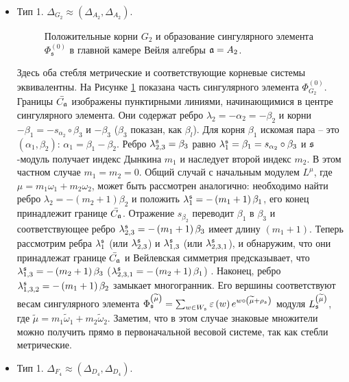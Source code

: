 \begin{itemize}
\item
Тип 1. $\Delta _{G_{2}}\approx (\Delta _{A_{2}},\Delta
_{A_{2}}).$

 \begin{figure}[h!bt]
  \noindent{}
  \caption{Положительные корни $G_{2}$ и образование сингулярного элемента $\Phi^{(0)}_{\mathfrak{s}}$ в главной камере Вейля алгебры $\mathfrak{a}=A_{2}$.}
  \label{fig:g2-roots}
\end{figure}
Здесь оба стебля метрические и соответствующие корневые системы эквивалентны. На Рисунке \ref{fig:g2-roots} показана часть сингулярного элемента $\Phi_{G_{2}}^{\left( 0\right) }$. Границы  $\bar{C_{\frak{a}}}$ изображены пунктирными линиями, начинающимися в центре сингулярного элемента. Они содержат ребро $\lambda _{2}=-\alpha _{2}=-\beta _{2}$ и корни $-\beta _{1}=-s_{\alpha _{2}}\circ \beta _{3}$ и $ -\beta _{3}$
($\beta _{3}$ показан, как $\beta _{l}$). Для корня $\beta_{1}$ искомая пара -- это  $(\alpha _{1}, \beta _{2})$: $\alpha _{1}=\beta _{1}-\beta _{2}$. Ребро $\lambda _{2,3}^{\mathfrak{s}}=\beta _{3}$ равно  $\lambda _{1}^{\frak{s}}=\beta _{1}=s_{\alpha _{2}}\circ \beta _{3}$ и  $\mathfrak{s}$-модуль получает индекс Дынкина $m_{1}$  и наследует второй индекс $m_{2}$. В этом частном случае  $m_{1}=m_{2}=0$.  Общий случай с начальным модулем $L^{\mu }$, где $\mu =m_{1}\omega _{1}+m_{2}\omega _{2}$, может быть рассмотрен аналогично: необходимо найти ребро $\lambda _{2}=-\left(
m_{2}+1\right) \beta _{2}$ и положить $\lambda_{1}^{\mathfrak{s}}=-\left( m_{1}+1\right) \beta _{1}$, его конец принадлежит границе $\bar{C_{\mathfrak{a}}}$. Отражение $s_{\beta_{2}} $ переводит $\beta _{1}$ в $\beta _{3}$ и соответствующее ребро
$\lambda _{2,3}^{\mathfrak{s}}=-\left( m_{1}+1\right) \beta _{3}$ имеет длину $\left( m_{1}+1\right) $. Теперь рассмотрим ребра $\lambda _{1}^{\mathfrak{s}}$ (или $\lambda _{2,3}^{\mathfrak{s}} $) и $\lambda _{1,3}^{\mathfrak{s}}$ (или $\lambda _{2,3,1}^{\mathfrak{s}}$), и обнаружим, что они принадлежат границе  $\bar{C_{\mathfrak{a}}}$ и Вейлевская симметрия предсказывает, что $\lambda _{1,3}^{\mathfrak{s}}=-\left( m_{2}+1\right)\beta _{3}$ ($\lambda _{2,3,1}^{\mathfrak{s}}=-\left( m_{2}+1\right) \beta _{1}$) . Наконец, ребро $\lambda _{1,3,2}^{\mathfrak{s}}=-\left(m_{1}+1\right) \beta _{2}$ замыкает многогранник. Его вершины соответствуют весам сингулярного элемента $\Phi _{\mathfrak{s}}^{\left( \widetilde{\mu }\right) }=\sum_{w\in W_{\mathfrak{s}}}\varepsilon \left( w\right) e^{w\circ \left(
\widetilde{\mu }+\rho_{\mathfrak{s}}\right) }$ модуля $L_{\mathfrak{s}}^{\left( \widetilde{\mu }\right) }$, где $\widetilde{\mu }=m_{1}\widetilde{\omega }_{1}+m_{2}\widetilde{\omega }_{2}$. Заметим, что в этом случае знаковые множители можно получить прямо в первоначальной весовой системе, так как стебли метрические.
\item
Тип 1. $\Delta _{F_{4}}\approx (\Delta _{D_{4}},\Delta_{D_{4}}).$


\end{itemize}
